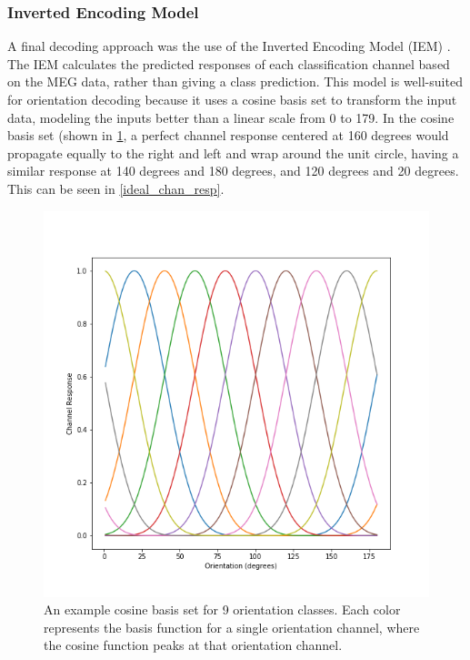 \documentclass[../main.tex]{subfiles}
\begin{document}
\subsubsection{Inverted Encoding Model}
A final decoding approach was the use of the Inverted Encoding Model (IEM) \citep{Brouwer09, Brouwer, GARCIA2013515,sprague_serences_2013, sprague_saproo_serences_2015}. The IEM calculates the predicted responses of each classification channel based on the MEG data, rather than giving a class prediction. This model is well-suited for orientation decoding because it uses a cosine basis set to transform the input data, modeling the inputs better than a linear scale from 0 to 179. In the cosine basis set (shown in \ref{basis_set}, a perfect channel response centered at 160 degrees would propagate equally to the right and left and wrap around the unit circle, having a similar response at 140 degrees and 180 degrees, and 120 degrees and 20 degrees. This can be seen in \ref{ideal_chan_resp}. 

\begin{figure}
    \centering
    \includegraphics[scale=0.7]{figures/methods/basis_set.png}
    \caption{An example cosine basis set for 9 orientation classes. Each color represents the
    basis function for a single orientation channel, where the cosine function peaks at that
    orientation channel.}
    \label{basis_set}
\end{figure}
\end{document}
